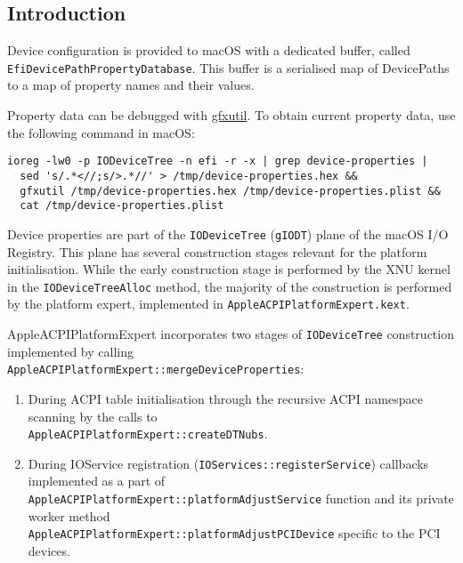 \documentclass[]{article}
\providecommand{\tightlist}{%
  \setlength{\itemsep}{0pt}\setlength{\parskip}{0pt}}
\begin{document}
\subsection{Introduction}\label{devpropsintro}

Device configuration is provided to macOS with a dedicated buffer,
called \texttt{EfiDevicePathPropertyDatabase}. This buffer is a serialised
map of DevicePaths to a map of property names and their values.

Property data can be debugged with
\href{https://github.com/acidanthera/gfxutil}{gfxutil}.
To obtain current property data, use the following command in macOS:
\begin{lstlisting}[label=gfxutil, style=ocbash]
ioreg -lw0 -p IODeviceTree -n efi -r -x | grep device-properties |
  sed 's/.*<//;s/>.*//' > /tmp/device-properties.hex &&
  gfxutil /tmp/device-properties.hex /tmp/device-properties.plist &&
  cat /tmp/device-properties.plist
\end{lstlisting}

Device properties are part of the \texttt{IODeviceTree} (\texttt{gIODT})
plane of the macOS I/O Registry. This plane has several construction stages
relevant for the platform initialisation. While the early construction
stage is performed by the XNU kernel in the \texttt{IODeviceTreeAlloc}
method, the majority of the construction is performed by the platform expert,
implemented in \texttt{AppleACPIPlatformExpert.kext}.

AppleACPIPlatformExpert incorporates two stages of \texttt{IODeviceTree}
construction implemented by calling \\
\texttt{AppleACPIPlatformExpert::mergeDeviceProperties}:

\begin{enumerate}
  \tightlist
  \item During ACPI table initialisation through the recursive ACPI namespace scanning
  by the calls to \\
  \texttt{AppleACPIPlatformExpert::createDTNubs}.
  \item During IOService registration (\texttt{IOServices::registerService}) callbacks
  implemented as a part of \\
  \texttt{AppleACPIPlatformExpert::platformAdjustService}
  function and its private worker method \\
  \texttt{AppleACPIPlatformExpert::platformAdjustPCIDevice}
  specific to the PCI devices.
\end{enumerate}
\end{document}
